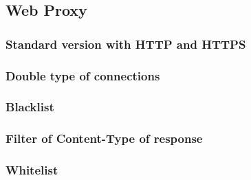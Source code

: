 \subsection{Web Proxy}
\subsubsection{Standard version with HTTP and HTTPS}

\clearpage
\subsubsection{Double type of connections}

\clearpage
\subsubsection{Blacklist}

\clearpage
\subsubsection{Filter of Content-Type of response}

\clearpage
\begin{comment}
\subsubsection{Limit of average bitrate}

\clearpage
\subsubsection{Limit of average bitrate (version 2)}

\clearpage
\subsubsection{Limit of bitrate}

\clearpage
\end{comment}
\subsubsection{Whitelist}

\clearpage

